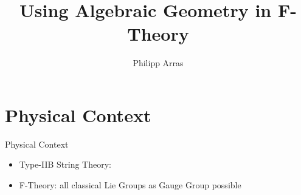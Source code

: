 \documentclass[notes=hide]{beamer}
\author{Philipp Arras}
\title{Using Algebraic Geometry in F-Theory}
\institute{Institute for Theoretical Physics Heidelberg}
\begin{document}
\begin{frame}
\titlepage
\end{frame}

\begin{frame}
\tableofcontents
\end{frame}

\section{Physical Context}
\begin{frame}{Physical Context}
\begin{itemize}
\item Type-IIB String Theory: 
\item F-Theory: all classical Lie Groups as Gauge Group possible
\end{itemize}
\end{frame}
\end{document}
